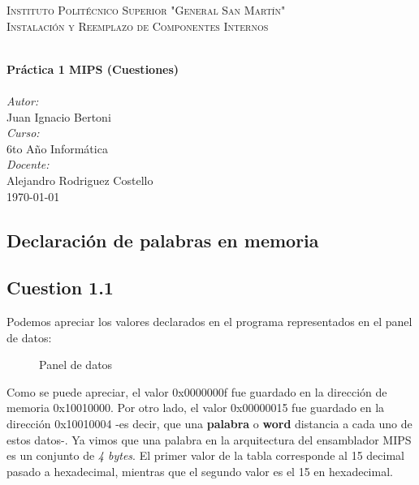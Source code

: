 \documentclass[11pt]{article}
\begin{document}
\begin{large}
\begin{titlepage}
\center 
 
\textsc{\LARGE Instituto Politécnico Superior "General San Martín"}\\[1cm]

\textsc{\Large Instalación y Reemplazo de Componentes Internos}\\[0.2cm]				
\vspace{7.5mm}

\HRule \\[0.8cm]
{ \huge \bfseries Práctica 1 MIPS (Cuestiones)}\\[0.7cm]								%
\HRule \\[2cm]
\large
\emph{Autor:}\\
Juan Ignacio Bertoni\\[1.5cm]	
\emph{Curso:}\\
6to Año Informática\\[1.5cm]	
\emph{Docente:}\\
Alejandro Rodriguez Costello\\[1.5cm]	

{\large \today}\\[5cm]
\vfill 
\end{titlepage}



\vfill

\begin{flushleft}

\section*{Declaración de palabras en memoria}
\subsection*{Cuestion 1.1}
Podemos apreciar los valores declarados en el programa representados en el panel de datos:

\begin{figure}[H]
    \centering
    \caption{Panel de datos}
    \label{fig:my_label}
\end{figure}

Como se puede apreciar, el valor 0x0000000f fue guardado en la dirección de memoria 0x10010000. Por otro lado, el valor 0x00000015 fue guardado en la dirección 0x10010004 -es decir, que una \textbf{palabra} o \textbf{word} distancia a cada uno de estos datos-. Ya vimos que una palabra en la arquitectura del ensamblador MIPS es un conjunto de \textit{4 bytes}. El primer valor de la tabla corresponde al 15 decimal pasado a hexadecimal, mientras que el segundo valor es el 15 en hexadecimal.




\end{flushleft}
\end{large}
\end{document}
